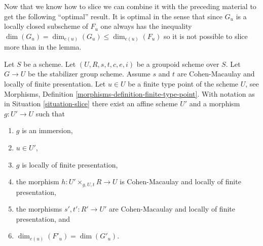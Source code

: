 \noindent
Now that we know how to slice we can combine it with the preceding material
to get the following ``optimal'' result. It is optimal in the sense that
since $G_u$ is a locally closed subscheme of $F_u$ one always has the
inequality $\dim(G_u) = \dim_{e(u)}(G_u) \leq \dim_{e(u)}(F_u)$ so it
is not possible to slice more than in the lemma.

\begin{lemma}
\label{lemma-max-slice}
Let $S$ be a scheme.
Let $(U, R, s, t, c, e, i)$ be a groupoid scheme over $S$.
Let $G \to U$ be the stabilizer group scheme.
Assume $s$ and $t$ are Cohen-Macaulay and locally of finite presentation.
Let $u \in U$ be a finite type point of the scheme $U$, see
Morphisms, Definition \ref{morphisms-definition-finite-type-point}.
With notation as in
Situation \ref{situation-slice}
there exist an affine scheme $U'$ and a morphism $g : U' \to U$ such that
\begin{enumerate}
\item $g$ is an immersion,
\item $u \in U'$,
\item $g$ is locally of finite presentation,
\item the morphism $h : U' \times_{g, U, t} R \longrightarrow U$
is Cohen-Macaulay and locally of finite presentation,
\item the morphisms $s', t' : R' \to U'$ are Cohen-Macaulay and
locally of finite presentation, and
\item $\dim_{e(u)}(F'_u) = \dim(G'_u)$.
\end{enumerate}
\end{lemma}

